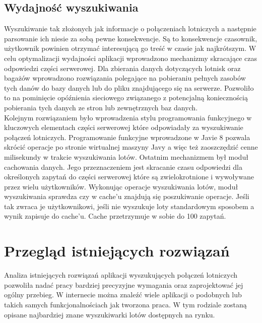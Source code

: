 \documentclass[a4paper, 12pt, twoside]{article}
\begin{document}
\subsection{Wydajność wyszukiwania}
Wyszukiwanie tak złożonych jak informacje o połączeniach lotniczych a następnie parsowanie ich niesie za sobą pewne konsekwencje. Są to konsekwencje czasownik, użytkownik powinien otrzymać interesującą go treść w czasie jak najkrótszym. W celu optymalizacji wydajności aplikacji wprowadzono mechanizmy skracające czas odpowiedzi części serwerowej. Dla zbierania danych dotyczących lotnisk oraz bagażów wprowadzono rozwiązania polegające na pobieraniu pełnych zasobów tych danów do bazy danych lub do pliku znajdującego się na serwerze. Pozwoliło to na pominięcie opóźnienia sieciowego związanego z potencjalną koniecznością pobierania tych danych ze stron lub zewnętrznych baz danych. \\
Kolejnym rozwiązaniem było wprowadzenia stylu programowania funkcyjnego w kluczowych elementach części serwerowej które odpowiadały za wyszukiwanie połączeń lotniczych. Programowanie funkcyjne wprowadzone w Javie 8 pozwala skrócić operacje po stronie wirtualnej maszyny Javy a więc też zaoszczędzić cenne milisekundy w trakcie wyszukiwania lotów.
Ostatnim mechanizmem był moduł cachowania danych. Jego przeznaczeniem jest skracanie czasu odpowiedzi dla określonych zapytań do części serwerowej które są zwielokrotnione i wywoływane przez wielu użytkowników. Wykonując operacje wyszukiwania lotów, moduł wyszukiwania sprawdza czy w cache'u znajdują się poszukiwanie operacje. Jeśli tak zwraca je użytkownikowi, jeśli nie wyszukuje loty standardowym sposobem a wynik zapisuje do cache'u. Cache przetrzymuje w sobie do 100 zapytań.
\newpage
\section{Przegląd istniejących rozwiązań}
Analiza istniejących rozwiązań aplikacji wyszukujących połączeń lotniczych pozwoliła nadać pracy bardziej precyzyjne wymagania oraz zaprojektować jej ogólny przebieg. W internecie można znaleźć wiele aplikacji o podobnych lub takich samych funkcjonalnościach jak tworzona praca. W tym rodziale zostaną opisane najbardziej znane wyszukiwarki lotów dostępnych na rynku. 
\end{document}

